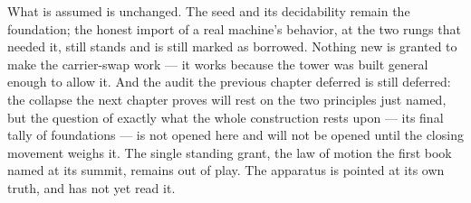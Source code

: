 What is assumed is unchanged. The seed and its decidability remain the foundation; the honest import of a
real machine's behavior, at the two rungs that needed it, still stands and is still marked as borrowed.
Nothing new is granted to make the carrier-swap work --- it works because the tower was built general
enough to allow it. And the audit the previous chapter deferred is still deferred: the collapse the next
chapter proves will rest on the two principles just named, but the question of exactly what the whole
construction rests upon --- its final tally of foundations --- is not opened here and will not be opened
until the closing movement weighs it. The single standing grant, the law of motion the first book named at
its summit, remains out of play. The apparatus is pointed at its own truth, and has not yet read it.
